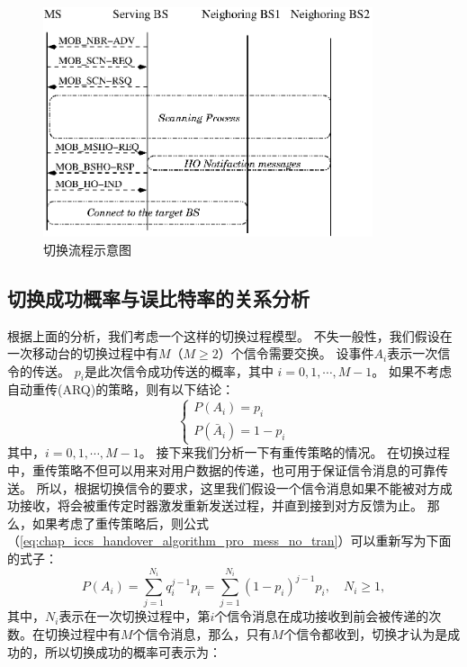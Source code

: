 \begin{figure}[t]
\centering
\includegraphics[height=6.75cm]{iccs_handover}
\caption{切换流程示意图}
\label{fig:chap_iccs_handover_algorithm_handover_flow}
\end{figure}

\subsection{切换成功概率与误比特率的关系分析}
根据上面的分析，我们考虑一个这样的切换过程模型。
不失一般性，我们假设在一次移动台的切换过程中有$M$（$M \ge 2 $）个信令需要交换。
设事件$A_i$表示一次信令的传送。
 $p_i$是此次信令成功传送的概率，其中 $i = 0,1, \cdots, M-1 $。
如果不考虑自动重传(ARQ)的策略，则有以下结论：
\begin{equation}
\label{eq:chap_iccs_handover_algorithm_pro_mess_no_tran}
\begin{cases}
P(A_{i})=p_{i}\\
P(\bar{A}_{i})=1- p_{i}
\end{cases}
\end{equation}
其中，$i=0,1,\cdots,M-1$。
接下来我们分析一下有重传策略的情况。
在切换过程中，重传策略不但可以用来对用户数据的传递，也可用于保证信令消息的可靠传送。
所以，根据切换信令的要求，这里我们假设一个信令消息如果不能被对方成功接收，将会被重传定时器激发重新发送过程，并直到接到对方反馈为止。
那么，如果考虑了重传策略后，则公式 （\ref{eq:chap_iccs_handover_algorithm_pro_mess_no_tran}）可以重新写为下面的式子：
\begin{equation}
\label{eq:chap_iccs_handover_algorithm_Pro_basic01}
P(A_{i})=\sum_{j=1}^{N_{i}}q_{i}^{j-1}p_{i}=\sum_{j=1}^{N_{i}}
(1-p_{i})^{j-1}p_{i},\quad N_{i}\geq1,
\end{equation}
其中，$N_i$表示在一次切换过程中，第$i$个信令消息在成功接收到前会被传递的次数。在切换过程中有$M$个信令消息，那么，只有$M$个信令都收到，切换才认为是成功的，所以切换成功的概率可表示为：

